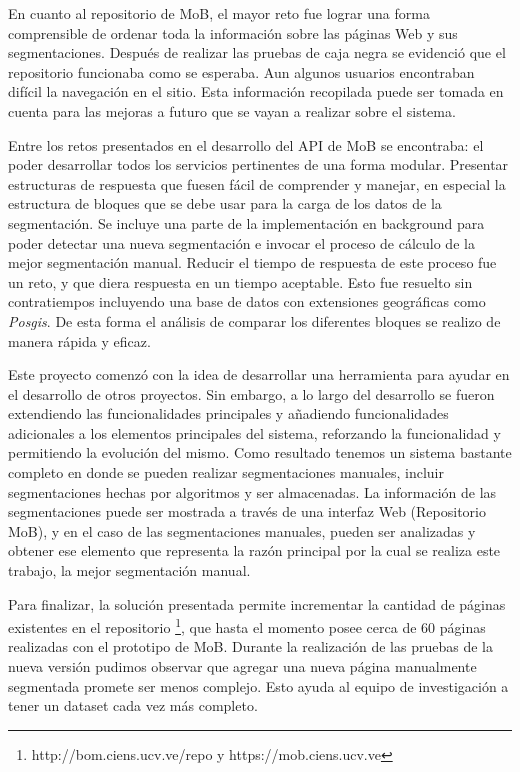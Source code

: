 \documentclass[10pt]{revecom}
\begin{document}
En cuanto al repositorio de MoB, el mayor reto fue lograr una forma comprensible de ordenar toda la información sobre las páginas Web y sus segmentaciones. Después de realizar las pruebas de caja negra se evidenció que el repositorio funcionaba como se esperaba. Aun algunos usuarios encontraban difícil la navegación en el sitio. Esta información recopilada puede ser tomada en cuenta para las mejoras a futuro que se vayan a realizar sobre el sistema. 

Entre los retos presentados en el desarrollo del API de MoB se encontraba: el poder desarrollar todos los servicios pertinentes de una forma modular. Presentar estructuras de respuesta que fuesen fácil de comprender y manejar, en especial la estructura de bloques que se debe usar para la carga de los datos de la segmentación. 
Se incluye una parte de la implementación en background para poder detectar una nueva segmentación e invocar el proceso de cálculo de la mejor segmentación manual. Reducir el tiempo de respuesta de este proceso fue un reto, y que diera respuesta en un tiempo aceptable. Esto fue resuelto sin contratiempos incluyendo una base de datos con extensiones geográficas como \textit{Posgis}. De esta forma el análisis de comparar los diferentes bloques se realizo de manera rápida y eficaz.

Este proyecto comenzó con la idea de desarrollar una herramienta para ayudar en el desarrollo de otros proyectos. Sin embargo, a lo largo del desarrollo se fueron extendiendo las funcionalidades principales y añadiendo funcionalidades adicionales a los elementos principales del sistema, reforzando la funcionalidad y permitiendo la evolución del mismo. Como resultado tenemos un sistema bastante completo en donde se pueden realizar segmentaciones manuales,  incluir segmentaciones hechas por algoritmos y ser almacenadas. La información de las segmentaciones puede ser mostrada a través de una interfaz Web (Repositorio MoB), y en el caso de las segmentaciones manuales, pueden ser analizadas y obtener ese elemento que representa la razón principal por la cual se realiza este trabajo, la mejor segmentación manual. 


Para finalizar, la solución presentada permite incrementar la cantidad de páginas existentes en el repositorio \footnote{http://bom.ciens.ucv.ve/repo y https://mob.ciens.ucv.ve}, que hasta el momento posee cerca de 60 p\'aginas realizadas con el prototipo de MoB. 
Durante la realizaci\'on de las pruebas de la nueva versi\'on pudimos observar que agregar una nueva p\'agina manualmente segmentada promete ser menos complejo.
Esto ayuda al equipo de investigaci\'on a tener un dataset cada vez m\'as completo.
\end{document}
